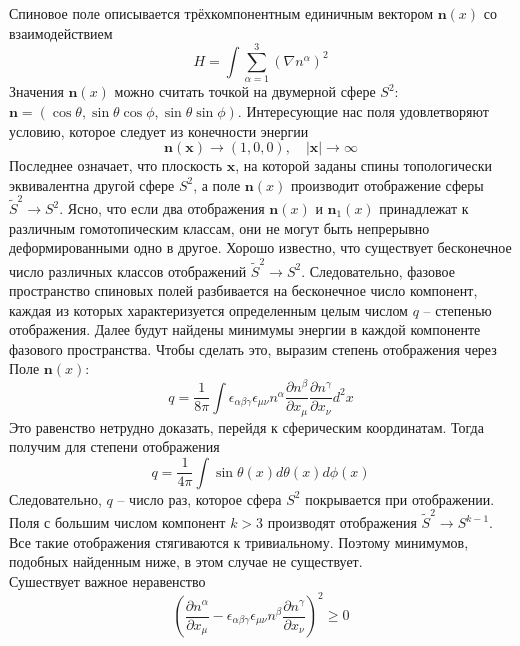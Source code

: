 \documentclass[12pt]{article}
\theoremstyle{definition}
\begin{document}
Спиновое поле описывается трёхкомпонентным единичным вектором $\bm{n}(x)$ со взаимодействием
\begin{equation}
    H=\int\sum\limits_{\alpha=1}^3(\nabla n^\alpha)^2
\end{equation}
Значения $\bm{n}(x)$ можно считать точкой на двумерной сфере $S^2$: $\bm{n}=(\cos\theta,\sin\theta\cos\phi,\sin\theta\sin\phi)$. Интересующие нас поля удовлетворяют условию, которое следует из конечности энергии
\begin{equation}\label{eq323}
    \bm{n}(\bm{x})\rightarrow(1,0,0),\quad|\bm{x}|\rightarrow\infty
\end{equation}
Последнее означает, что плоскость $\bm{x}$, на которой заданы спины топологически эквивалентна другой сфере $S^2$, а поле $\bm{n}(x)$ производит отображение сферы $\tilde{S}^2\rightarrow S^2$. Ясно, что если два отображения $\mathbf{n}(x)$ и $\mathbf{n}_1(x)$ принадлежат к различным гомотопическим классам, они не могут быть непрерывно деформированными одно в другое. Хорошо известно, что существует бесконечное число различных классов отображений $\tilde{S}^2 \rightarrow S^2$. Следовательно, фазовое пространство спиновых полей разбивается на бесконечное число компонент, каждая из которых характеризуется определенным целым числом $q$ -- степенью отображения. Далее будут найдены минимумы энергии в каждой компоненте фазового пространства. Чтобы сделать это, выразим степень отображения через Поле $\bm{n}(x)$:
\begin{equation}\label{eq318}
    q=\frac{1}{8\pi}\int \epsilon_{\alpha\beta\gamma}\epsilon_{\mu\nu}n^\alpha\frac{\partial n^\beta}{\partial x_\mu}\frac{\partial n^\gamma}{\partial x_\nu}d^2x
\end{equation}
Это равенство нетрудно доказать, перейдя к сферическим координатам. Тогда получим для степени отображения
$$
q=\frac{1}{4 \pi} \int \sin \theta(x) d \theta(x) d \phi(x)
$$
Следовательно, $q$ -- число раз, которое сфера $S^2$ покрывается при отображении. Поля с большим числом компонент $k>3$ производят отображения $\tilde{S}^2\rightarrow S^{k-1}$. Все такие отображения стягиваются к тривиальному. Поэтому минимумов, подобных найденным ниже, в этом случае не существует.\\
Сушествует важное неравенство
\begin{equation}\label{eq319}           \left(\frac{\partial n^\alpha}{\partial x_\mu}-\epsilon_{\alpha\beta\gamma}\epsilon_{\mu\nu}n^\beta \frac{\partial n^\gamma}{\partial x_\nu}\right)^2\geq 0
\end{equation}
\end{document}

